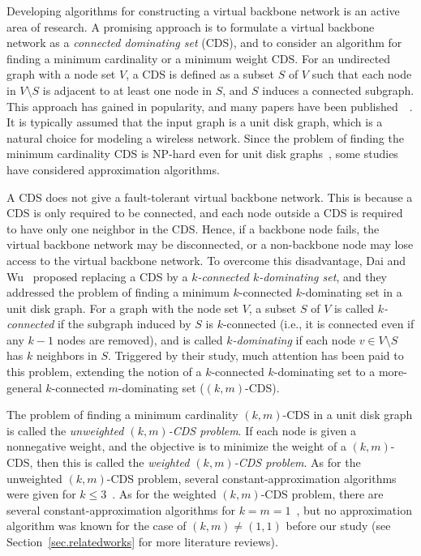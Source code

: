 \documentclass[11pt]{article}
\begin{document}
Developing algorithms for constructing a virtual backbone network
is an active area of research.
A promising approach
is to formulate
a virtual backbone network 
as a \emph{connected dominating set} (CDS), and
to consider an algorithm for finding a minimum cardinality or a minimum
weight CDS.
For an undirected graph with a node set $V$, a CDS
is defined as a subset $S$ of $V$ such that
each node in $V \setminus S$ is adjacent to at least one node in $S$,
and $S$ induces a connected subgraph.
This approach has gained in popularity,
and many papers have been published~~\cite{AmbuhlEMN06,ChengHLWD03,GuhaK98,GuhaK99,MaratheBHRR95,ZouLGW09}.
It is typically assumed that the input graph is a unit disk graph,
which is a natural choice for modeling a wireless network.
Since the problem of finding the minimum
cardinality CDS
is NP-hard even for unit disk graphs~\cite{ClarkCJ90},
some studies have considered approximation algorithms.


A CDS does not give a fault-tolerant virtual backbone network.
This is because a CDS is only required to be connected,
and each node outside a CDS is required to have only one neighbor in the CDS.
Hence, if a backbone node fails,
the virtual backbone network may be disconnected,
or a non-backbone node may lose access to the virtual backbone network.
To overcome this disadvantage, 
Dai and
Wu~\cite{Dai:2006}
proposed replacing a CDS by a \emph{$k$-connected $k$-dominating set},
and they addressed the problem of finding a minimum $k$-connected
$k$-dominating set in a unit disk graph.
For a graph with the node set $V$,
a subset $S$ of $V$
is called \emph{$k$-connected} if the subgraph induced by $S$
is $k$-connected (i.e., it is connected even if any $k-1$ nodes are
removed),
and is called \emph{$k$-dominating} if each node $v \in V\setminus S$ has $k$
neighbors in $S$.
Triggered by their study, 
much attention has been paid to this problem,
extending the notion of 
a $k$-connected $k$-dominating set to a more-general $k$-connected $m$-dominating
set ($(k,m)$-CDS).

The problem of finding a minimum cardinality $(k,m)$-CDS in a unit disk
graph is called the \emph{unweighted $(k,m)$-CDS problem}.
If each node is given
a nonnegative weight, and
the objective is to minimize the weight of a $(k,m)$-CDS,
then this is called the \emph{weighted $(k,m)$-CDS problem}.
As for the unweighted $(k,m)$-CDS problem,
several 
constant-approximation algorithms were given
for $k\leq 3$~\cite{Shang:2007jg,ShiZZW16,WangKAGLZW13,Wang:2015,Zhang16}.
As for the weighted $(k,m)$-CDS problem,
there are several constant-approximation algorithms for $k=m=1$~\cite{AmbuhlEMN06,ZouLGW09},
but no approximation algorithm was known for
the case of $(k,m)\neq (1,1)$ before our study
(see Section~\ref{sec.relatedworks} for more literature reviews).
\end{document}
